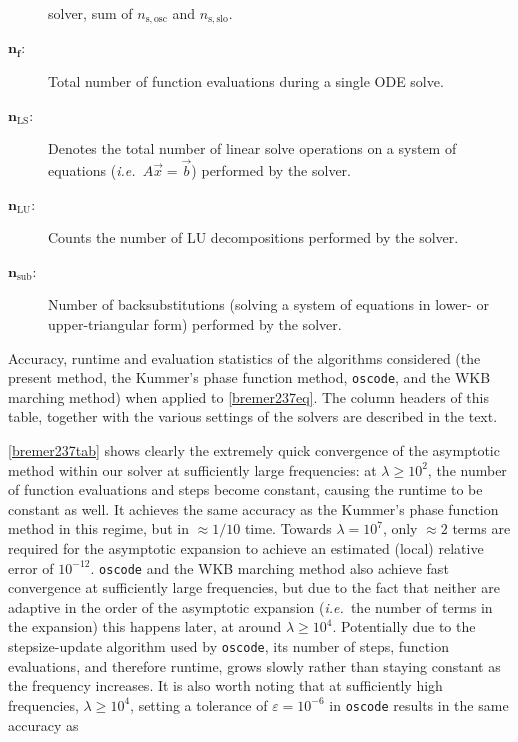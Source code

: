 \documentclass[10pt]{article}
\newcommand{\ie}{{\it i.e.\ }}
\begin{document}
\begin{description}
{        solver, sum of $n_{\mathrm{s,osc}}$ and $n_{\mathrm{s,slo}}$.}
    \item[$\bm{n_f}$:]{Total number of function evaluations during a single ODE solve.}
    \item[$\bm{n_{\mathrm{LS}}}$:]{Denotes the total number of linear solve
        operations on a system of equations (\ie $A\vec{x} = \vec{b}$)
        performed by the solver.}
    \item[$\bm{n_{\mathrm{LU}}}$:]{Counts the number of LU decompositions
        performed by the solver. }
    \item[$\bm{n_{\mathrm{sub}}}$:]{Number of backsubstitutions (solving a
        system of equations in lower- or upper-triangular form) performed by
        the solver.}
\end{description}
%
\begin{table}[tb]
    \renewcommand{\arraystretch}{1.2}
    \resizebox{\textwidth}{!}{}
    \caption{\label{bremer237tab} Accuracy, runtime and evaluation statistics of the algorithms
    considered (the present method, the Kummer's phase function method, \texttt{oscode},
    and the WKB marching method) when applied to \cref{bremer237eq}. The column
    headers of this table, together with the various settings of the solvers
    are described in the text.}
\end{table}
%
\cref{bremer237tab} shows clearly the extremely quick convergence of the asymptotic method within our solver
at sufficiently large frequencies: at $\lambda \geq 10^2$, the number of
function evaluations and steps become constant, causing the runtime to be
constant as well. It achieves the same accuracy as the Kummer's phase function method in
this regime, but in $\approx 1/10$ time. Towards $\lambda = 10^7$, only
$\approx 2$ terms are required for the asymptotic expansion to achieve an
estimated (local) relative error of $10^{-12}$. 
\texttt{oscode} and the WKB
marching method also achieve fast convergence at sufficiently large
frequencies, but due to the fact that neither are adaptive in the order of the
asymptotic expansion (\ie the number of terms in the expansion) this
happens later, at around $\lambda \geq 10^4$. Potentially due to the
stepsize-update algorithm used by \texttt{oscode}, its number of steps,
function evaluations, and therefore runtime, grows slowly rather than staying
constant as the frequency increases. It is also worth noting that at
sufficiently high frequencies, $\lambda \geq 10^4$, setting a tolerance of
$\varepsilon = 10^{-6}$ in \texttt{oscode} results in the same accuracy as
\end{document}
